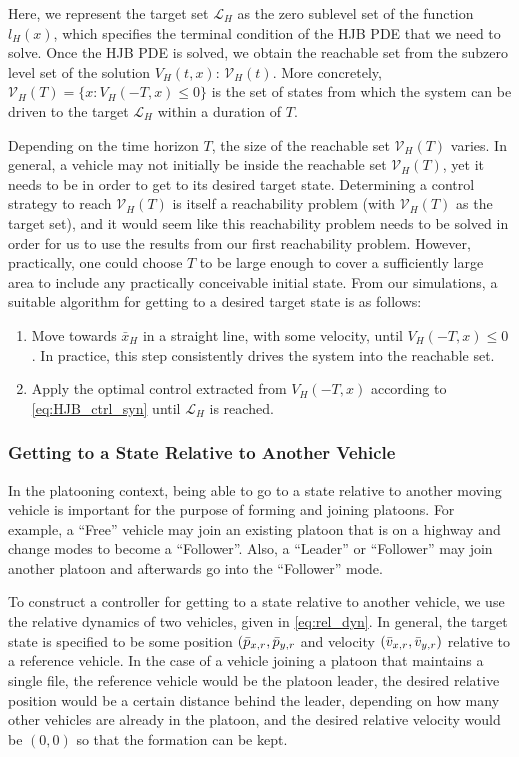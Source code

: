 Here, we represent the target set $\mathcal{L}_H$ as the zero sublevel set of the function $l_H(x)$, which specifies the terminal condition of the HJB PDE that we need to solve. Once the HJB PDE is solved, we obtain the reachable set from the subzero level set of the solution $V_H(t,x)$: $\mathcal V_H(t)$. More concretely, $\mathcal{V}_H(T) = \{x: V_H(-T,x)\le 0\}$ is the set of states from which the system can be driven to the target $\mathcal{L}_H$ within a duration of $T$. 

Depending on the time horizon $T$, the size of the reachable set $\mathcal V_H(T)$ varies. In general, a vehicle may not initially be inside the reachable set $\mathcal V_H(T)$, yet it needs to be in order to get to its desired target state. Determining a control strategy to reach $\mathcal V_H(T)$ is itself a reachability problem (with $\mathcal V_H(T)$ as the target set), and it would seem like this reachability problem needs to be solved in order for us to use the results from our first reachability problem. However, practically, one could choose $T$ to be large enough to cover a sufficiently large area to include any practically conceivable initial state. From our simulations, a suitable algorithm for getting to a desired target state is as follows:

\begin{enumerate}
\item Move towards $\bar{x}_H$ in a straight line, with some velocity, until $V_H(-T,x)\le 0$. In practice, this step consistently drives the system into the reachable set.
\item Apply the optimal control extracted from $V_H(-T,x)$ according to \eqref{eq:HJB_ctrl_syn} until $\mathcal{L}_H$ is reached.
\end{enumerate}

\subsubsection{Getting to a State Relative to Another Vehicle \label{sec:rel_target_ctrl}}
In the platooning context, being able to go to a state relative to another moving vehicle is important for the purpose of forming and joining platoons. For example, a ``Free'' vehicle may join an existing platoon that is on a highway and change modes to become a ``Follower''. Also, a ``Leader'' or ``Follower'' may join another platoon and afterwards go into the ``Follower'' mode.

To construct a controller for getting to a state relative to another vehicle, we use the relative dynamics of two vehicles, given in \ref{eq:rel_dyn}. In general, the target state is specified to be some position $(\bar{p}_{x,r}, \bar{p}_{y,r}$ and velocity $(\bar{v}_{x,r}, \bar{v}_{y,r})$ relative to a reference vehicle. In the case of a vehicle joining a platoon that maintains a single file, the reference vehicle would be the platoon leader, the desired relative position would be a certain distance behind the leader, depending on how many other vehicles are already in the platoon, and the desired relative velocity would be $(0,0)$ so that the formation can be kept.

